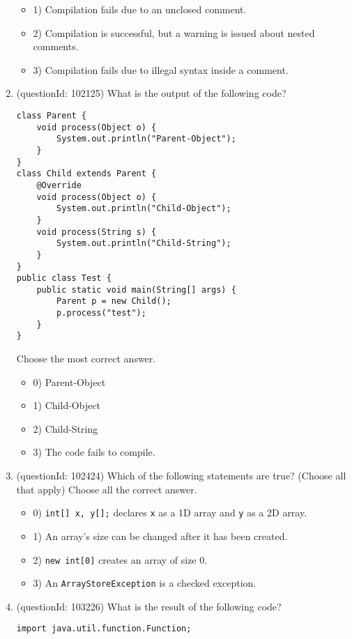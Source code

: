 \documentclass[12pt]{article}
\begin{document}
\begin{enumerate}[label=(\arabic*)]
\begin{itemize}
\item 1) Compilation fails due to an unclosed comment.

\item 2) Compilation is successful, but a warning is issued about nested comments.

\item 3) Compilation fails due to illegal syntax inside a comment.

\end{itemize}
\item (questionId: 102125) What is the output of the following code?\n\begin{verbatim}
class Parent {
    void process(Object o) {
        System.out.println("Parent-Object");
    }
}
class Child extends Parent {
    @Override
    void process(Object o) {
        System.out.println("Child-Object");
    }
    void process(String s) {
        System.out.println("Child-String");
    }
}
public class Test {
    public static void main(String[] args) {
        Parent p = new Child();
        p.process("test");
    }
}
\end{verbatim}
Choose the most correct answer. 
\begin{itemize}
\item 0) Parent-Object

\item 1) Child-Object

\item 2) Child-String

\item 3) The code fails to compile.

\end{itemize}
\item (questionId: 102424) Which of the following statements are true? (Choose all that apply)
Choose all the correct answer.\begin{itemize}
\item 0) \verb|int[] x, y[];| declares \verb|x| as a 1D array and \verb|y| as a 2D array.

\item 1) An array's size can be changed after it has been created.

\item 2) \verb|new int[0]| creates an array of size 0.

\item 3) An \verb|ArrayStoreException| is a checked exception.

\end{itemize}
\item (questionId: 103226) What is the result of the following code?
\begin{verbatim}
import java.util.function.Function;


\end{verbatim}
\end{enumerate}
\end{document}
